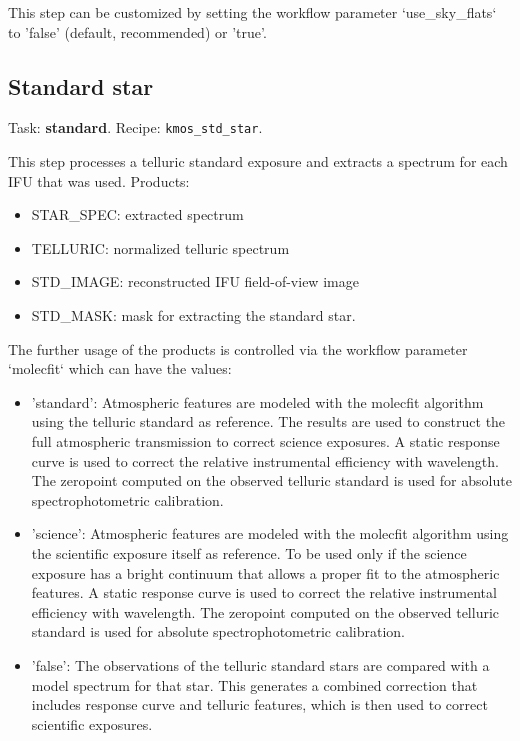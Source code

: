 This step can be customized by setting the workflow parameter
`use\_sky\_flats` to 'false' (default, recommended) or 'true'.

\subsection{Standard star}

Task: {\bf standard}. Recipe: {\tt kmos\_std\_star}. 

This step processes a telluric standard exposure and extracts a spectrum for each IFU that was used.
Products:
\begin{itemize}
\item STAR\_SPEC: extracted spectrum
\item  TELLURIC: normalized telluric spectrum
\item  STD\_IMAGE: reconstructed IFU field-of-view image
\item  STD\_MASK: mask for extracting the standard star.
\end{itemize}

The further usage of the products is controlled via the workflow parameter `molecfit` which can have the values:

\begin{itemize}
\item  'standard': Atmospheric features are modeled with the molecfit algorithm using the telluric standard as
                reference. The results are used to construct the full atmospheric transmission to correct
                science exposures. A static response curve is used to correct the relative instrumental 
                efficiency with wavelength. The zeropoint computed on the observed telluric standard is used for
                absolute spectrophotometric calibration.
\item  'science': Atmospheric features are modeled with the molecfit algorithm using the scientific exposure itself
                as reference. To be used only if the science exposure has a bright continuum that allows
                a proper fit to the atmospheric features. A static response curve is used to correct the
                relative instrumental efficiency with wavelength. The zeropoint computed
                on the observed telluric standard is used for absolute spectrophotometric calibration.
\item  'false': The observations of the telluric standard stars are compared with a model spectrum for that star.
                This generates a combined correction that includes response curve and telluric features, which is then
                used to correct scientific exposures.
\end{itemize}

